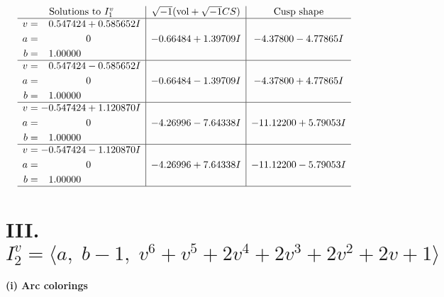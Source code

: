 \documentclass[1p]{elsarticle_modified}
\theoremstyle{definition}
\newcommand{\I}{\sqrt{-1}}
\begin{document}
$$\begin{array}{c|c|c}  
\text{Solutions to }I^v_{1}& \I (\text{vol} + \sqrt{-1}CS) & \text{Cusp shape}\\
 \hline 
\begin{aligned}
v &= \phantom{-}0.547424 + 0.585652 I \\
a &= \phantom{-0.000000 } 0 \\
b &= \phantom{-}1.00000\phantom{ +0.000000I}\end{aligned}
 & -0.66484 + 1.39709 I & -4.37800 - 4.77865 I \\ \hline\begin{aligned}
v &= \phantom{-}0.547424 - 0.585652 I \\
a &= \phantom{-0.000000 } 0 \\
b &= \phantom{-}1.00000\phantom{ +0.000000I}\end{aligned}
 & -0.66484 - 1.39709 I & -4.37800 + 4.77865 I \\ \hline\begin{aligned}
v &= -0.547424 + 1.120870 I \\
a &= \phantom{-0.000000 } 0 \\
b &= \phantom{-}1.00000\phantom{ +0.000000I}\end{aligned}
 & -4.26996 - 7.64338 I & -11.12200 + 5.79053 I \\ \hline\begin{aligned}
v &= -0.547424 - 1.120870 I \\
a &= \phantom{-0.000000 } 0 \\
b &= \phantom{-}1.00000\phantom{ +0.000000I}\end{aligned}
 & -4.26996 + 7.64338 I & -11.12200 - 5.79053 I\\
 \hline 
 \end{array}$$\newpage\newpage\renewcommand{\arraystretch}{1}
\centering \section*{III. $I^v_{2}= \langle a,\;b-1,\;v^6+v^5+2 v^4+2 v^3+2 v^2+2 v+1 \rangle$}
\flushleft \textbf{(i) Arc colorings}\\
\end{document}
